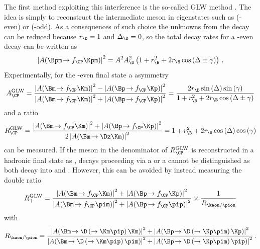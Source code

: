 The first method exploiting this interference is the so-called GLW method \cite{GLW_1, GLW_2}.
The idea is simply to reconstruct the intermediate \D meson in \CP eigenstates such as \Kp\Km (\CP-even) or \KS\piz (\CP-odd).
As a consequences of such choice the unknowns from the \D decay can be reduced because $r_\D=1$ and $\Delta_\D=0$, so the total decay rates for \eg a \CP-even \D decay can be written as
\begin{equation}
\left|A\!\left(\Bpm\!\to f_{\CP}\Kpm\right)\right|^2=A^2A_\D^2\left(1+r_\B^2+2r_\B\cos\left(\Delta\pm\gamma\right)\right)\,.\label{eq:totDecRateGLW}
\end{equation}
Experimentally, for the \CP-even final state a \CP asymmetry
\begin{equation}
A_{\CP}^{\text{GLW}}=\frac{\left|A\!\left(\Bm\!\to f_{\CP}\Km\right)\right|^2-\left|A\!\left(\Bp\!\to f_{\CP}\Kp\right)\right|^2}{\left|A\!\left(\Bm\!\to f_{\CP}\Km\right)\right|^2+\left|A\!\left(\Bp\!\to f_{\CP}\Kp\right)\right|^2}=\frac{2r_\B\sin\left(\Delta\right)\sin\left(\gamma\right)}{1+r_\B^2+2r_\B\cos\left(\Delta\pm\gamma\right)}\label{eq:ACP_GLW}
\end{equation}
and a \CP ratio
\begin{equation}
R_{\CP}^{\text{GLW}}=\frac{\left|A\!\left(\Bm\!\to f_{\CP}\Km\right)\right|^2+\left|A\!\left(\Bp\!\to f_{\CP}\Kp\right)\right|^2}{2\left|A\!\left(\Bm\!\to\Dz\Km\right)\right|^2}=1+r_\B^2+2r_\B\cos\left(\Delta\right)\cos\left(\gamma\right)\label{eq:RCP_GLW}
\end{equation}
can be measured.
If the \D meson in the denominator of $R_{\CP}^{\text{GLW}}$ is reconstructed in a hadronic final state as \kaon\pion, decays proceeding via a \Dz or a \Dzb cannot be distinguished as both decay into \Kp\pim and \Km\pip.
However, this can be avoided by instead measuring the double ratio
\begin{equation}
R_{+}^{\text{GLW}}=\frac{\left|A\!\left(\Bm\!\to f_{\CP}\Km\right)\right|^2+\left|A\!\left(\Bp\!\to f_{\CP}\Kp\right)\right|^2}{\left|A\!\left(\Bm\!\to f_{\CP}\pim\right)\right|^2+\left|A\!\left(\Bp\!\to f_{\CP}\pip\right)\right|^2}\times\frac{1}{R_{\kaon/\pion}}
\end{equation}
with
\begin{equation}
R_{\kaon/\pion}=\frac{\left|A\!\left(\Bm\!\to \D\left(\to\Km\pip\right)\Km\right)\right|^2+\left|A\!\left(\Bp\!\to \D\left(\to\Kp\pim\right)\Kp\right)\right|^2}{\left|A\!\left(\Bm\!\to \D\left(\to\Km\pip\right)\pim\right)\right|^2+\left|A\!\left(\Bp\!\to \D\left(\to\Kp\pim\right)\pip\right)\right|^2}\,.
\end{equation}
